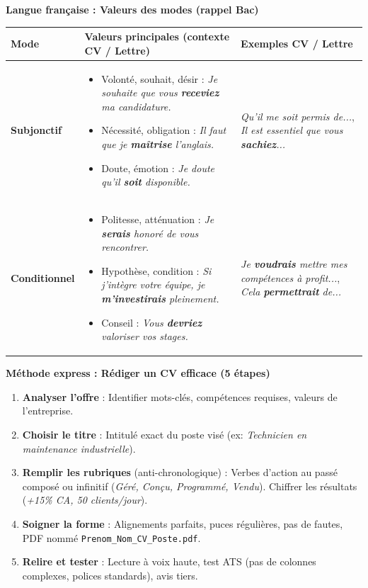 \documentclass[11pt]{article}
\begin{document}
\begin{bilan}
\textbf{Langue française : Valeurs des modes (rappel Bac)}
\begin{center}
\begin{tabularx}{\linewidth}{|l|X|X|}\hline
\rowcolor{popblueL} \textbf{Mode} & \textbf{Valeurs principales (contexte CV / Lettre)} & \textbf{Exemples CV / Lettre} \\ \hline
\textbf{Subjonctif} & \begin{itemize}\item Volonté, souhait, désir : \emph{Je souhaite que vous \textbf{receviez} ma candidature.}\item Nécessité, obligation : \emph{Il faut que je \textbf{maîtrise} l'anglais.}\item Doute, émotion : \emph{Je doute qu'il \textbf{soit} disponible.}\end{itemize} & \textit{Qu'il me soit permis de...}, \textit{Il est essentiel que vous \textbf{sachiez}...} \\ \hline
\textbf{Conditionnel} & \begin{itemize}\item Politesse, atténuation : \emph{Je \textbf{serais} honoré de vous rencontrer.}\item Hypothèse, condition : \emph{Si j'intègre votre équipe, je \textbf{m'investirais} pleinement.}\item Conseil : \emph{Vous \textbf{devriez} valoriser vos stages.}\end{itemize} & \textit{Je \textbf{voudrais} mettre mes compétences à profit...}, \textit{Cela \textbf{permettrait} de...} \\ \hline
\end{tabularx}
\end{center}

\textbf{Méthode express : Rédiger un CV efficace (5 étapes)}
\begin{enumerate}
  \item \textbf{Analyser l'offre} : Identifier mots-clés, compétences requises, valeurs de l'entreprise.
  \item \textbf{Choisir le titre} : Intitulé exact du poste visé (ex: \emph{Technicien en maintenance industrielle}).
  \item \textbf{Remplir les rubriques} (anti-chronologique) : Verbes d'action au passé composé ou infinitif (\emph{Géré, Conçu, Programmé, Vendu}). Chiffrer les résultats (\emph{+15\% CA, 50 clients/jour}).
  \item \textbf{Soigner la forme} : Alignements parfaits, puces régulières, pas de fautes, PDF nommé \texttt{Prenom\_Nom\_CV\_Poste.pdf}.
  \item \textbf{Relire et tester} : Lecture à voix haute, test ATS (pas de colonnes complexes, polices standards), avis tiers.
\end{enumerate}


\end{bilan}
\end{document}
